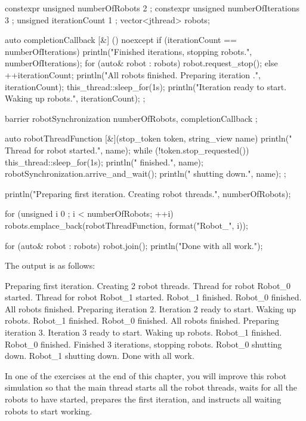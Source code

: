 \begin{cpp}
constexpr unsigned numberOfRobots { 2 };
constexpr unsigned numberOfIterations { 3 };
unsigned iterationCount { 1 };
vector<jthread> robots;

auto completionCallback { [&] () noexcept {
    if (iterationCount == numberOfIterations) {
        println("Finished {} iterations, stopping robots.", numberOfIterations);
        for (auto& robot : robots) { robot.request_stop(); }
    } else {
        ++iterationCount;
        println("All robots finished. Preparing iteration {}.", iterationCount);
        this_thread::sleep_for(1s);
        println("Iteration {} ready to start. Waking up robots.", iterationCount);
    }
} };

barrier robotSynchronization { numberOfRobots, completionCallback };

auto robotThreadFunction { [&](stop_token token, string_view name) {
        println(" Thread for robot {} started.", name);
        while (!token.stop_requested()) {
            this_thread::sleep_for(1s);
            println(" {} finished.", name);
            robotSynchronization.arrive_and_wait();
        }
        println(" {} shutting down.", name);
} };

println("Preparing first iteration. Creating {} robot threads.", numberOfRobots);

for (unsigned i { 0 }; i < numberOfRobots; ++i) {
    robots.emplace_back(robotThreadFunction, format("Robot_{}", i));
}

for (auto& robot : robots) { robot.join(); }
println("Done with all work.");
\end{cpp}

The output is as follows:

\begin{shell}
Preparing first iteration. Creating 2 robot threads.
    Thread for robot Robot_0 started.
    Thread for robot Robot_1 started.
    Robot_1 finished.
    Robot_0 finished.
All robots finished. Preparing iteration 2.
Iteration 2 ready to start. Waking up robots.
    Robot_1 finished.
    Robot_0 finished.
All robots finished. Preparing iteration 3.
Iteration 3 ready to start. Waking up robots.
    Robot_1 finished.
    Robot_0 finished.
Finished 3 iterations, stopping robots.
    Robot_0 shutting down.
    Robot_1 shutting down.
Done with all work.
\end{shell}

In one of the exercises at the end of this chapter, you will improve this robot simulation so that the main thread starts all the robot threads, waits for all the robots to have started, prepares the first iteration, and instructs all waiting robots to start working.


















